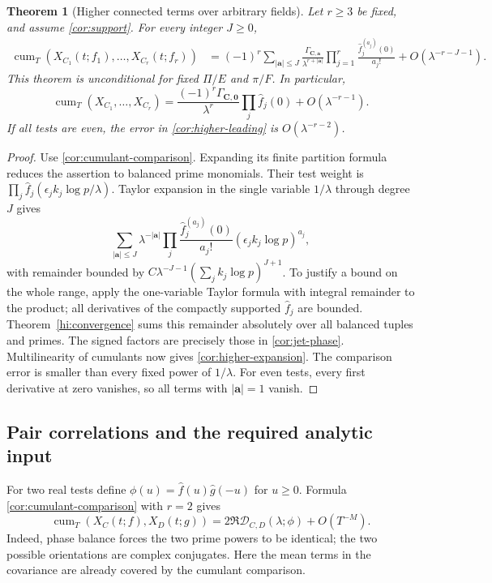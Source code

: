 \documentclass[11pt,reqno]{amsart}
\numberwithin{equation}{section}
\newtheorem{theorem}{Theorem}[section]
\theoremstyle{definition}
\theoremstyle{remark}
\begin{document}
\begin{theorem}[Higher connected terms over arbitrary fields]\label{cor:higher}
Let $r\ge3$ be fixed, and assume \eqref{cor:support}. For every integer $J\ge0$,
\begin{align}
\operatorname{cum}_T(X_{C_1}(t;f_1),\ldots,X_{C_r}(t;f_r))
&=(-1)^r\sum_{|\boldsymbol a|\le J}
\frac{\Gamma_{\boldsymbol C,\boldsymbol a}}{\lambda^{r+|\boldsymbol a|}}
\prod_{j=1}^r\frac{\widehat f_j^{(a_j)}(0)}{a_j!}
+O(\lambda^{-r-J-1}).\label{cor:higher-expansion}
\end{align}
This theorem is unconditional for fixed $\Pi/E$ and $\pi/F$. In particular,
\begin{equation}\operatorname{cum}_T(X_{C_1},\ldots,X_{C_r})
=\frac{(-1)^r\Gamma_{\boldsymbol C,\boldsymbol0}}{\lambda^r}
\prod_j\widehat f_j(0)+O(\lambda^{-r-1}).\label{cor:higher-leading}\end{equation}
If all tests are even, the error in \eqref{cor:higher-leading} is $O(\lambda^{-r-2})$.
\end{theorem}
\begin{proof}
Use \eqref{cor:cumulant-comparison}. Expanding its finite partition formula reduces the assertion to balanced prime monomials. Their test weight is
$\prod_j\widehat f_j(\epsilon_jk_j\log p/\lambda)$. Taylor expansion in the single variable $1/\lambda$ through degree $J$ gives
\[
\sum_{|\boldsymbol a|\le J}\lambda^{-|\boldsymbol a|}
\prod_j\frac{\widehat f_j^{(a_j)}(0)}{a_j!}
 (\epsilon_j k_j\log p)^{a_j},
\]
with remainder bounded by
$C\lambda^{-J-1}(\sum_j k_j\log p)^{J+1}$. To justify a bound on the whole range, apply the one-variable Taylor formula with integral remainder to the product; all derivatives of the compactly supported $\widehat f_j$ are bounded. Theorem~\ref{hi:convergence} sums this remainder absolutely over all balanced tuples and primes. The signed factors are precisely those in \eqref{cor:jet-phase}. Multilinearity of cumulants now gives \eqref{cor:higher-expansion}. The comparison error is smaller than every fixed power of $1/\lambda$. For even tests, every first derivative at zero vanishes, so all terms with $|\boldsymbol a|=1$ vanish.
\end{proof}

\subsection{Pair correlations and the required analytic input}
For two real tests define $\phi(u)=\widehat f(u)\widehat g(-u)$ for $u\ge0$. Formula \eqref{cor:cumulant-comparison} with $r=2$ gives
\begin{equation}\operatorname{cum}_T(X_C(t;f),X_D(t;g))
=2\Re\mathcal D_{C,D}(\lambda;\phi)+O(T^{-M}).\label{cor:pair-exact}\end{equation}
Indeed, phase balance forces the two prime powers to be identical; the two possible orientations are complex conjugates. Here the mean terms in the covariance are already covered by the cumulant comparison.
\end{document}
